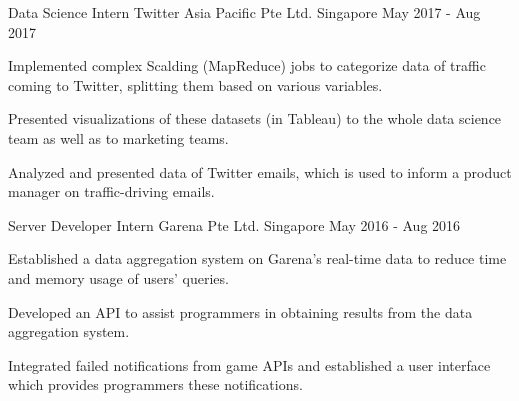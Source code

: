 

\begin{cventries}

  \cventry
  {Data Science Intern} %
  {Twitter Asia Pacific Pte Ltd.} %
  {Singapore} %
  {May 2017 - Aug 2017} %
  {
    \begin{cvitems} %
    \item {Implemented complex Scalding (MapReduce) jobs to categorize data of traffic coming to Twitter, splitting them based on various variables.}
    \item {Presented visualizations of these datasets (in Tableau) to the whole data science team as well as to marketing teams.}
    \item {Analyzed and presented data of Twitter emails, which is used to inform a product manager on traffic-driving emails.}
    \end{cvitems}
  }

  \cventry
  {Server Developer Intern} %
  {Garena Pte Ltd.} %
  {Singapore} %
  {May 2016 - Aug 2016} %
  {
    \begin{cvitems} %
    \item {Established a data aggregation system on Garena's real-time data to reduce time and memory usage of users' queries.}
    \item {Developed an API to assist programmers in obtaining results from the data aggregation system.}
    \item {Integrated failed notifications from game APIs and established a user interface which provides programmers these notifications.}
    \end{cvitems}
  }

\end{cventries}

